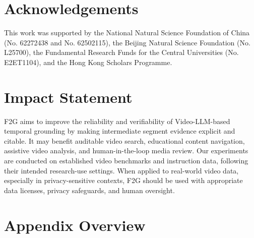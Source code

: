 \documentclass{article}
\theoremstyle{plain}
\theoremstyle{definition}
\theoremstyle{remark}
\begin{document}
\section*{Acknowledgements}

This work was supported by the National Natural Science Foundation of China (No. 62272438 and No. 62502115), the Beijing Natural Science Foundation (No. L25700), the Fundamental Research Funds for the Central Universities (No. E2ET1104), and the Hong Kong Scholars Programme.

\section*{Impact Statement}

F2G aims to improve the reliability and verifiability of Video-LLM-based temporal grounding by making intermediate segment evidence explicit and citable.
It may benefit auditable video search, educational content navigation, assistive video analysis, and human-in-the-loop media review.
Our experiments are conducted on established video benchmarks and instruction data, following their intended research-use settings.
When applied to real-world video data, especially in privacy-sensitive contexts, F2G should be used with appropriate data licenses, privacy safeguards, and human oversight.


\nocite{*}



\newpage
\appendix
\onecolumn

\section{Appendix Overview}
\end{document}
